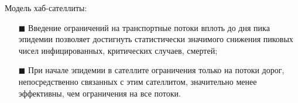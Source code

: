 \documentclass[a4paper,12pt]{article} %
\begin{document}
Модель хаб-сателлиты:
\begin{itemize}
\item[$\blacksquare$] Введение ограничений на транспортные потоки вплоть до
дня пика эпидемии позволяет достигнуть статистически значимого снижения пиковых
чисел инфицированных, критических случаев, смертей;
\item[$\blacksquare$] При начале эпидемии в сателлите ограничения только на потоки дорог, непосредственно связанных с этим сателлитом, значительно менее эффективны, чем ограничения на все потоки.
\end{itemize}
\end{document}
